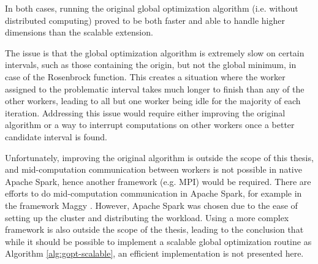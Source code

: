 \documentclass[../scalable-gopt.tex]{subfiles}
\begin{document}
  In both cases, running the original global optimization algorithm (i.e. without distributed computing) 
  proved to be both faster and able to handle higher dimensions than the scalable extension.

  The issue is that the global optimization algorithm is 
  extremely slow on certain intervals, 
  such as those containing the origin, but not the global minimum, 
  in case of the Rosenbrock function.
  This creates a situation where the worker assigned to 
  the problematic interval takes much longer to finish than 
  any of the other workers, leading to all but one worker being 
  idle for the majority of each iteration.
  Addressing this issue would require either improving the original algorithm or 
  a way to interrupt computations on other workers once 
  a better candidate interval is found.
  
  Unfortunately, improving the original algorithm is outside the scope of this thesis, 
  and mid-computation communication between workers is not possible in native Apache Spark, 
  hence another framework (e.g. MPI) would be required.
  There are efforts to do mid-computation communication in Apache Spark, 
  for example in the framework Maggy \cite{maggy}.
  However, Apache Spark was chosen due to the ease of setting up the cluster and distributing the workload.
  Using a more complex framework is also outside the scope of the thesis, 
  leading to the conclusion that while it should be possible to implement a 
  scalable global optimization routine as Algorithm \ref{alg:gopt-scalable}, 
  an efficient implementation is not presented here.
\end{document}
